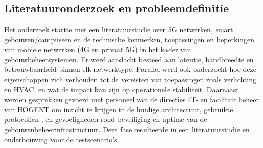 
\chapter{}%
\label{ch:methodologie}


\section{Literatuuronderzoek en probleemdefinitie}

Het onderzoek startte met een literatuurstudie over 5G netwerken, smart gebouwen/campussen en de technische kenmerken, toepassingen en beperkingen van mobiele netwerken (4G en privaat 5G) in het kader van gebouwbeheersystemen. Er werd aandacht besteed aan latentie, bandbreedte en betrouwbaarheid binnen elk netwerktype. Parallel werd ook onderzocht hoe deze eigenschappen zich verhouden tot de vereisten van toepassingen zoals verlichting en HVAC, en wat de impact kan zijn op operationele stabiliteit.
Daarnaast werden gesprekken gevoerd met personeel van de directies IT- en facilitair beheer van HOGENT om inzicht te krijgen in de huidige architectuur, gebruikte protocollen , en gevoeligheden rond beveiliging en uptime van de gebouwenbeheerinfrastructuur. Deze fase resulteerde in een literatuurstudie en onderbouwing voor de testscenario’s.


